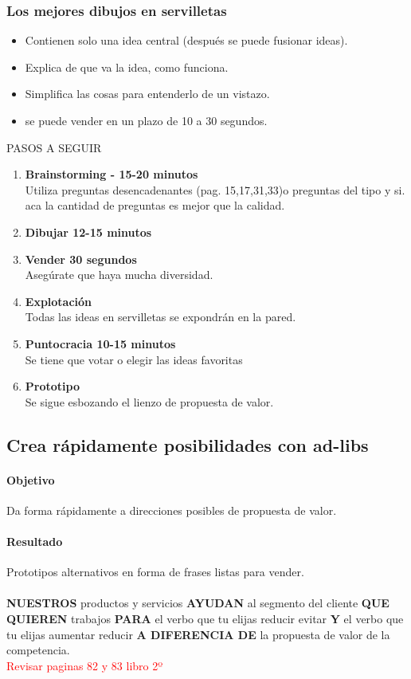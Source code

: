 \documentclass[11pt]{book}
\begin{document}
\subsubsection{Los mejores dibujos en servilletas}
\begin{itemize}
\item Contienen solo una idea central (después se puede fusionar ideas).
\item Explica de que va la idea, como funciona.
\item Simplifica las cosas para entenderlo de un vistazo.
\item se puede vender en un plazo de 10 a 30 segundos.
\end{itemize}
PASOS A SEGUIR
\begin{enumerate}
\item \textbf{ Brainstorming - 15-20 minutos }\\ Utiliza preguntas desencadenantes (pag. 15,17,31,33)o preguntas del tipo y si. aca la cantidad de preguntas es mejor que la calidad.
\item \textbf{Dibujar 12-15 minutos }\\ 
\item \textbf{ Vender 30 segundos }\\ Asegúrate que haya mucha diversidad.
\item \textbf{ Explotación }\\ Todas las ideas en servilletas se expondrán en la pared.
\item \textbf{ Puntocracia 10-15 minutos }\\ Se tiene que votar o elegir las ideas favoritas
\item \textbf{ Prototipo }\\ Se sigue esbozando el lienzo de propuesta de valor.
\end{enumerate}
\subsection{Crea rápidamente posibilidades con ad-libs}
\paragraph{Objetivo}
Da forma rápidamente a direcciones posibles de propuesta de valor.
\paragraph{Resultado}
Prototipos alternativos en forma de frases listas para vender. 
\\\\
\textbf{NUESTROS} productos y servicios \textbf{AYUDAN} al segmento del cliente \textbf{QUE QUIEREN } trabajos \textbf{PARA} el verbo que tu elijas reducir evitar \textbf{Y} el verbo que tu elijas aumentar reducir \textbf{A DIFERENCIA DE } la propuesta de valor de la competencia.\\
\textcolor{red}{Revisar paginas 82 y 83 libro 2º}
\end{document}

